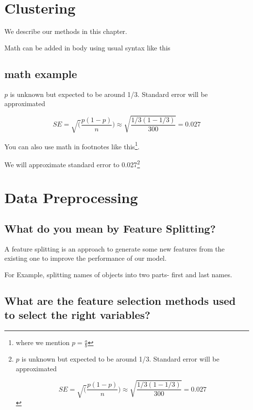 \documentclass[
]{book}
\begin{document}
\hypertarget{clustering}{%
\chapter{Clustering}\label{clustering}}

We describe our methods in this chapter.

Math can be added in body using usual syntax like this

\hypertarget{math-example}{%
\section{math example}\label{math-example}}

\(p\) is unknown but expected to be around 1/3. Standard error will be approximated

\[
SE = \sqrt(\frac{p(1-p)}{n}) \approx \sqrt{\frac{1/3 (1 - 1/3)} {300}} = 0.027
\]

You can also use math in footnotes like this\footnote{where we mention \(p = \frac{a}{b}\)}.

We will approximate standard error to 0.027\footnote{\(p\) is unknown but expected to be around 1/3. Standard error will be approximated

  \[
  SE = \sqrt(\frac{p(1-p)}{n}) \approx \sqrt{\frac{1/3 (1 - 1/3)} {300}} = 0.027
  \]}

\hypertarget{data-preprocessing}{%
\chapter{Data Preprocessing}\label{data-preprocessing}}

\hypertarget{what-do-you-mean-by-feature-splitting}{%
\section{What do you mean by Feature Splitting?}\label{what-do-you-mean-by-feature-splitting}}

A feature splitting is an approach to generate some new features from the existing one to improve the performance of our model.

For Example, splitting names of objects into two parts- first and last names.

\hypertarget{what-are-the-feature-selection-methods-used-to-select-the-right-variables}{%
\section{What are the feature selection methods used to select the right variables?}\label{what-are-the-feature-selection-methods-used-to-select-the-right-variables}}
\end{document}
